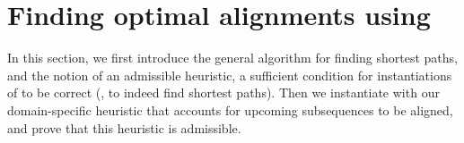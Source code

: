 \section{Finding optimal alignments using \A} \label{TRIEsec:astarix-algo}

In this section, we first introduce the general \A algorithm for finding
shortest paths, and the notion of an admissible heuristic, a sufficient
condition for instantiations of \A to be correct (\ie, to indeed find shortest
paths). Then we instantiate \A with our domain-specific heuristic that accounts
for upcoming subsequences to be aligned, and prove that this heuristic is
admissible.



